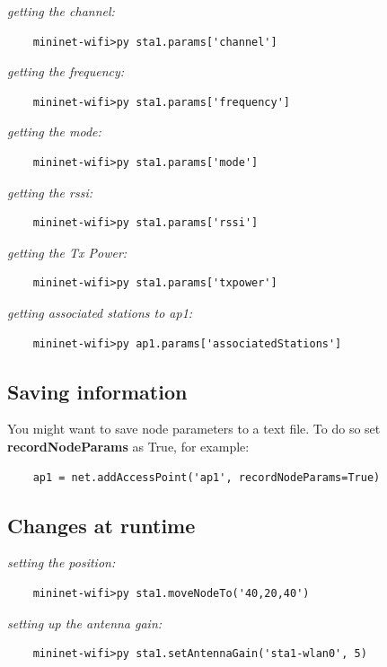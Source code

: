 \noindent \textit{getting the channel:}
\begin{verbatim}
    mininet-wifi>py sta1.params['channel']
\end{verbatim}

\noindent \textit{getting the frequency:}
\begin{verbatim}
    mininet-wifi>py sta1.params['frequency']
\end{verbatim}

\noindent \textit{getting the mode:}
\begin{verbatim}
    mininet-wifi>py sta1.params['mode']
\end{verbatim}

\noindent \textit{getting the rssi:}
\begin{verbatim}
    mininet-wifi>py sta1.params['rssi']
\end{verbatim}

\noindent \textit{getting the Tx Power:}
\begin{verbatim}
    mininet-wifi>py sta1.params['txpower']
\end{verbatim}

\noindent \textit{getting associated stations to ap1:}
\begin{verbatim}
    mininet-wifi>py ap1.params['associatedStations']
\end{verbatim}

\subsection{Saving information}

You might want to save node parameters to a text file. To do so set \textbf{recordNodeParams} as True, for example:
\begin{verbatim}
    ap1 = net.addAccessPoint('ap1', recordNodeParams=True)
\end{verbatim}

\subsection{Changes at runtime}

\noindent \textit{setting the position:}
\begin{verbatim}
    mininet-wifi>py sta1.moveNodeTo('40,20,40')
\end{verbatim}

\noindent \textit{setting up the antenna gain:}
\begin{verbatim}
    mininet-wifi>py sta1.setAntennaGain('sta1-wlan0', 5)
\end{verbatim}

